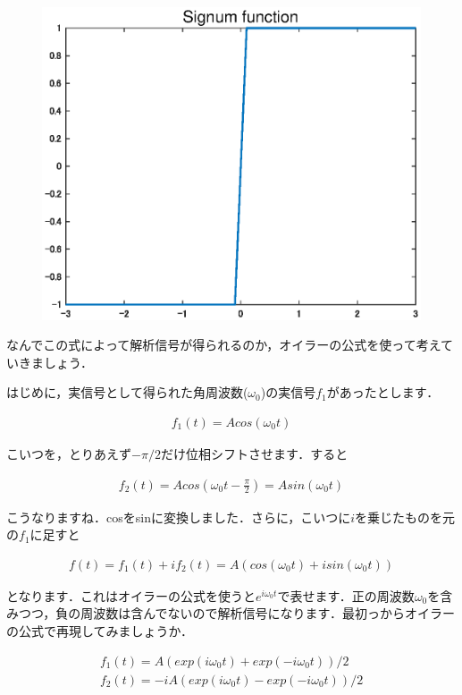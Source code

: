 \documentclass[11pt,a4paper]{ujreport} 	%
\begin{document}
\begin{figure}[H]
  \centering
  \includegraphics[width=12cm]{../figures/signum.eps}
\end{figure}

なんでこの式によって解析信号が得られるのか，オイラーの公式を使って考えていきましょう．

はじめに，実信号として得られた角周波数($\omega_0$)の実信号$f_1$があったとします．

\begin{eqnarray}
  f_1(t) = A cos(\omega_0 t)
\end{eqnarray}

こいつを，とりあえず$-\pi/2$だけ位相シフトさせます．すると

\begin{eqnarray}
  f_2(t) = A cos(\omega_0 t - \frac{\pi}{2}) = A sin(\omega_0 t)
\end{eqnarray}

こうなりますね．cosをsinに変換しました．さらに，こいつに$i$を乗じたものを元の$f_1$に足すと

\begin{eqnarray}
  \label{eq:hilbert3}
  f(t) = f_1(t) + if_2(t) = A(cos(\omega_0 t) + i sin(\omega_0 t))
\end{eqnarray}

となります．これはオイラーの公式を使うと$e^{i\omega_0 t}$で表せます．正の周波数$\omega_0$を含みつつ，負の周波数は含んでないので解析信号になります．最初っからオイラーの公式で再現してみましょうか．

\begin{eqnarray}
  f_1(t) = A(exp(i\omega_0 t) + exp(-i\omega_0 t))/2 \nonumber \\
  f_2(t) = -iA(exp(i\omega_0 t) - exp(-i\omega_0 t))/2
\end{eqnarray}
\end{document}
